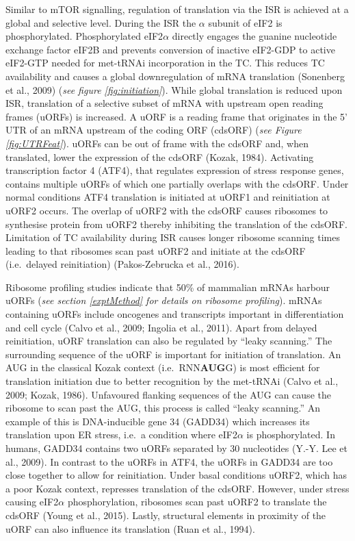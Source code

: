 \documentclass[
  12pt,
  openany]{book}
\begin{document}
Similar to mTOR signalling, regulation of translation via the ISR is achieved at a global and selective level. During the ISR the \(\alpha\) subunit of eIF2 is phosphorylated. Phosphorylated eIF2\(\alpha\) directly engages the guanine nucleotide exchange factor eIF2B and prevents conversion of inactive eIF2-GDP to active eIF2-GTP needed for met-tRNAi incorporation in the TC. This reduces TC availability and causes a global downregulation of mRNA translation (Sonenberg et al., 2009) (\emph{see figure \ref{fig:initiation}}). While global translation is reduced upon ISR, translation of a selective subset of mRNA with upstream open reading frames (uORFs) is increased. A uORF is a reading frame that originates in the 5' UTR of an mRNA upstream of the coding ORF (cdsORF) (\emph{see Figure \ref{fig:UTRFeat}}). uORFs can be out of frame with the cdsORF and, when translated, lower the expression of the cdsORF (Kozak, 1984). Activating transcription factor 4 (ATF4), that regulates expression of stress response genes, contains multiple uORFs of which one partially overlaps with the cdsORF. Under normal conditions ATF4 translation is initiated at uORF1 and reinitiation at uORF2 occurs. The overlap of uORF2 with the cdsORF causes ribosomes to synthesise protein from uORF2 thereby inhibiting the translation of the cdsORF. Limitation of TC availability during ISR causes longer ribosome scanning times leading to that ribosomes scan past uORF2 and initiate at the cdsORF (i.e.~delayed reinitiation) (Pakos-Zebrucka et al., 2016).

Ribosome profiling studies indicate that 50\% of mammalian mRNAs harbour uORFs (\emph{see section \ref{exptMethod} for details on ribosome profiling}). mRNAs containing uORFs include oncogenes and transcripts important in differentiation and cell cycle (Calvo et al., 2009; Ingolia et al., 2011). Apart from delayed reinitiation, uORF translation can also be regulated by ``leaky scanning.'' The surrounding sequence of the uORF is important for initiation of translation. An AUG in the classical Kozak context (i.e.~RNN\textbf{AUG}G) is most efficient for translation initiation due to better recognition by the met-tRNAi (Calvo et al., 2009; Kozak, 1986). Unfavoured flanking sequences of the AUG can cause the ribosome to scan past the AUG, this process is called ``leaky scanning.'' An example of this is DNA-inducible gene 34 (GADD34) which increases its translation upon ER stress, i.e.~a condition where eIF2\(\alpha\) is phosphorylated. In humans, GADD34 contains two uORFs separated by 30 nucleotides (Y.-Y. Lee et al., 2009). In contrast to the uORFs in ATF4, the uORFs in GADD34 are too close together to allow for reinitiation. Under basal conditions uORF2, which has a poor Kozak context, represses translation of the cdsORF. However, under stress causing eIF2\(\alpha\) phosphorylation, ribosomes scan past uORF2 to translate the cdsORF (Young et al., 2015). Lastly, structural elements in proximity of the uORF can also influence its translation (Ruan et al., 1994).
\end{document}

